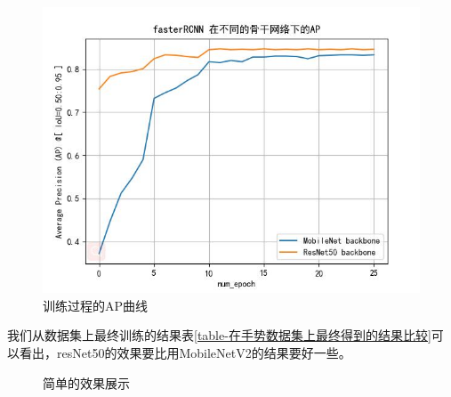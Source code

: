 \documentclass[UTF8,a4paper,12pt]{ctexart}
\begin{document}
\begin{figure}[htbp]
	\centering
	\includegraphics[width=0.5\linewidth]{webmin/resnetandmobilenetap.jpg}
	
	\caption{训练过程的AP曲线}
	\label{fig-ap曲线}
\end{figure}

我们从数据集上最终训练的结果表\ref{table-在手势数据集上最终得到的结果比较}可以看出，resNet50的效果要比用MobileNetV2的结果要好一些。

\begin{figure}[htbp]
	\centering
	\caption{简单的效果展示}
	\label{fig_ceshixiaoguozhanshi}
\end{figure}
\end{document}
